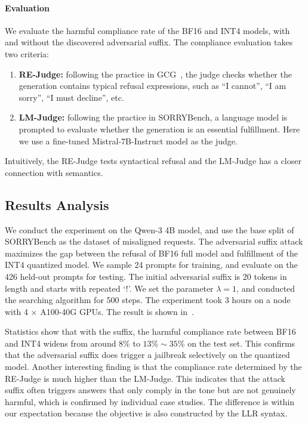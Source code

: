 \documentclass{article}
\begin{document}
\paragraph{Evaluation} We evaluate the harmful compliance rate of the BF16 and INT4 models, with and without the discovered adversarial suffix. The compliance evaluation takes two criteria:
\begin{enumerate}
  \item \textbf{RE-Judge:} following the practice in GCG~\cite{GCG}, the judge checks whether the generation contains typical refusal expressions, such as ``I cannot'', ``I am sorry'', ``I must decline'', etc.
  \item \textbf{LM-Judge:} following the practice in SORRYBench, a language model is prompted to evaluate whether the generation is an essential fulfillment.
  Here we use a fine-tuned Mistral-7B-Instruct model as the judge.
\end{enumerate}

Intuitively, the RE-Judge tests syntactical refusal and the LM-Judge has a closer connection with semantics.

\subsection{Results Analysis}

We conduct the experiment on the Qwen-3 4B model, and use the base split of SORRYBench as the dataset of misaligned requests. 
The adversarial suffix attack maximizes the gap between the refusal of BF16 full model and fulfillment of the INT4 quantized model.
We sample 24 prompts for training, and evaluate on the 426 held-out prompts for testing.
The initial adversarial suffix is 20 tokens in length and starts with repeated `!'.
We set the parameter $\lambda = 1$, and conducted the searching algorithm for 500 steps.
The experiment took 3 hours on a node with 4 $\times$ A100-40G GPUs.
The result is shown in~.

Statistics show that with the suffix, the harmful compliance rate between BF16 and INT4 widens from around 8\% to $13\% \sim 35\%$ on the test set.
This confirms that the adversarial suffix does trigger a jailbreak selectively on the quantized model.
Another interesting finding is that the compliance rate determined by the RE-Judge is much higher than the LM-Judge.
This indicates that the attack suffix often triggers answers that only comply in the tone but are not genuinely harmful, which is confirmed by individual case studies.
The difference is within our expectation because the objective is also constructed by the LLR syntax.
\end{document}
